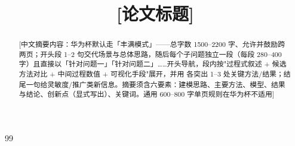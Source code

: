 \documentclass[bwprint]{gmcmthesis}
\title{[论文标题]}
\begin{document}
\maketitle

\begin{abstract}

[中文摘要内容：华为杯默认走「丰满模式」——总字数 1500--2200 字、允许并鼓励跨两页；开头段 1--2 句交代场景与总体思路，随后每个子问题独立一段（每段 280--400 字）且直接以「针对问题一」「针对问题二」……开头导航，段内按"过程式叙述 + 候选方法对比 + 中间过程数值 + 可视化手段"展开，并用 \textbf{} 各突出 1--3 处关键方法/结果；结尾一句给灵敏度/推广类新信息。摘要须含六要素：建模思路、主要方法、模型、结果与结论、创新点（显式写出）、关键词。通用 600--800 字单页规则在华为杯不适用]

\end{abstract}

\pagestyle{plain}

\clearpage
\clearpage












\begin{thebibliography}{99}
\end{thebibliography}

\begin{appendices}

\end{appendices}
\end{document}
